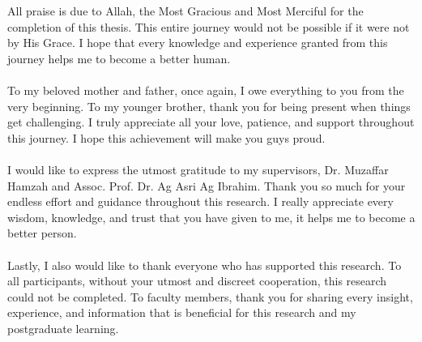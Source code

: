 
\begin{acknowledgement}[5 July 2021]
All praise is due to Allah, the Most Gracious and Most Merciful for the completion of this thesis. This entire journey would not be possible if it were not by His Grace. I hope that every knowledge and experience granted from this journey helps me to become a better human.
\\ \\ \noindent
To my beloved mother and father, once again, I owe everything to you from the very beginning. To my younger brother, thank you for being present when things get challenging. I truly appreciate all your love, patience, and support throughout this journey. I hope this achievement will make you guys proud.
\\ \\ \noindent
I would like to express the utmost gratitude to my supervisors, Dr. Muzaffar Hamzah and Assoc. Prof. Dr. Ag Asri Ag Ibrahim. Thank you so much for your endless effort and guidance throughout this research. I really appreciate every wisdom, knowledge, and trust that you have given to me, it helps me to become a better person.
\\ \\ \noindent
Lastly, I also would like to thank everyone who has supported this research. To all participants, without your utmost and discreet cooperation, this research could not be completed. To faculty members, thank you for sharing every insight, experience, and information that is beneficial for this research and my postgraduate learning.

\end{acknowledgement}